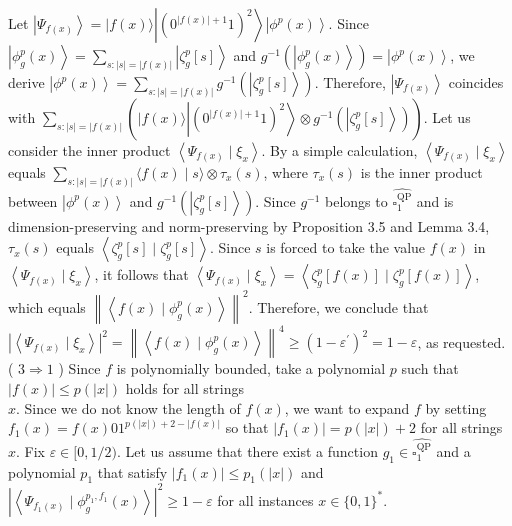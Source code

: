 \documentclass[10pt]{article}
\begin{document}
Let $\left|\Psi_{f(x)}\right\rangle=|f(x)\rangle\left|\left(0^{|f(x)|+1} 1\right)^{2}\right\rangle\left|\phi^{p}(x)\right\rangle$. Since $\left|\phi_{g}^{p}(x)\right\rangle=\sum_{s:|s|=|f(x)|}\left|\zeta_{g}^{p}[s]\right\rangle$ and $g^{-1}\left(\left|\phi_{g}^{p}(x)\right\rangle\right)= \left|\phi^{p}(x)\right\rangle$, we derive $\left|\phi^{p}(x)\right\rangle=\sum_{s:|s|=|f(x)|} g^{-1}\left(\left|\zeta_{g}^{p}[s]\right\rangle\right)$. Therefore, $\left|\Psi_{f(x)}\right\rangle$ coincides with $\sum_{s:|s|=|f(x)|}\left(|f(x)\rangle\left|\left(0^{|f(x)|+1} 1\right)^{2}\right\rangle \otimes g^{-1}\left(\left|\zeta_{g}^{p}[s]\right\rangle\right)\right)$. Let us consider the inner product $\left\langle\Psi_{f(x)} \mid \xi_{x}\right\rangle$. By a simple calculation, $\left\langle\Psi_{f(x)} \mid \xi_{x}\right\rangle$ equals $\sum_{s:|s|=|f(x)|}\langle f(x) \mid s\rangle \otimes \tau_{x}(s)$, where $\tau_{x}(s)$ is the inner product between $\left|\phi^{p}(x)\right\rangle$ and $g^{-1}\left(\left|\zeta_{g}^{p}[s]\right\rangle\right)$. Since $g^{-1}$ belongs to $\widehat{\square_{1}^{\mathrm{QP}}}$ and is dimension-preserving and norm-preserving by Proposition 3.5 and Lemma 3.4, $\tau_{x}(s)$ equals $\left\langle\zeta_{g}^{p}[s] \mid \zeta_{g}^{p}[s]\right\rangle$. Since $s$ is forced to take the value $f(x)$ in $\left\langle\Psi_{f(x)} \mid \xi_{x}\right\rangle$, it follows that $\left\langle\Psi_{f(x)} \mid \xi_{x}\right\rangle=\left\langle\zeta_{g}^{p}[f(x)] \mid \zeta_{g}^{p}[f(x)]\right\rangle$, which equals $\left\|\left\langle f(x) \mid \phi_{g}^{p}(x)\right\rangle\right\|^{2}$. Therefore, we conclude that $\left|\left\langle\Psi_{f(x)} \mid \xi_{x}\right\rangle\right|^{2}=\left\|\left\langle f(x) \mid \phi_{g}^{p}(x)\right\rangle\right\|^{4} \geq\left(1-\varepsilon^{\prime}\right)^{2}=1-\varepsilon$, as requested.\\
( $3 \Rightarrow 1$ ) Since $f$ is polynomially bounded, take a polynomial $p$ such that $|f(x)| \leq p(|x|)$ holds for all strings\\
$x$. Since we do not know the length of $f(x)$, we want to expand $f$ by setting $f_{1}(x)=f(x) 01^{p(|x|)+2-|f(x)|}$ so that $\left|f_{1}(x)\right|=p(|x|)+2$ for all strings $x$. Fix $\varepsilon \in[0,1 / 2)$. Let us assume that there exist a function $g_{1} \in \widehat{\square_{1}^{\mathrm{QP}}}$ and a polynomial $p_{1}$ that satisfy $\left|f_{1}(x)\right| \leq p_{1}(|x|)$ and $\left|\left\langle\Psi_{f_{1}(x)} \mid \phi_{g}^{p_{1}, f_{1}}(x)\right\rangle\right|^{2} \geq 1-\varepsilon$ for all instances $x \in\{0,1\}^{*}$.
\end{document}
